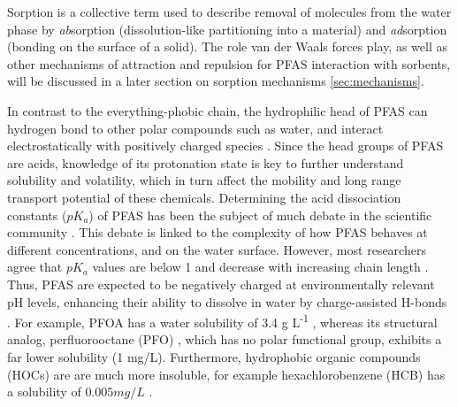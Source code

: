 Sorption is a collective term used to describe removal of molecules from the water phase by \textit{ab}sorption (dissolution-like partitioning into a material) and \textit{ad}sorption (bonding on the surface of a solid). The role van der Waals forces play, as well as other mechanisms of attraction and repulsion for PFAS interaction with sorbents, will be discussed in a later section on sorption mechanisms \cref{sec:mechanisms}. 

In contrast to the everything-phobic chain, the hydrophilic head of PFAS can hydrogen bond to other polar compounds such as water, and interact electrostatically with positively charged species \citep{sigmund2022sorption}. Since the head groups of PFAS are acids, knowledge of its protonation state is key to further understand solubility and volatility, which in turn affect the mobility and long range transport potential of these chemicals. Determining the acid dissociation constants (\(pK_a\)) of PFAS has been the subject of much debate in the scientific community \citep{Goss2009comment}. This debate is linked to the complexity of how PFAS behaves at different concentrations, and on the water surface. However, most researchers agree that \(pK_a\) values are below 1 and decrease with increasing chain length \citep{wang2011physchem,Reemtsma2016}. Thus, PFAS are expected to be negatively charged at environmentally relevant pH levels, enhancing their ability to dissolve in water by charge-assisted H-bonds \citep{Reemtsma2016}. For example, PFOA has a water solubility of 3.4 g L\textsuperscript{-1} \citep{PFOA}, whereas its structural analog, perfluorooctane (PFO) \citep{PFO}, which has no polar functional group, exhibits a far lower solubility (1 mg/L). Furthermore, hydrophobic organic compounds (HOCs) are are much more insoluble, for example hexachlorobenzene (HCB) has a solubility of $0.005 mg/L$ \citep{mcphedran2013hydrophobic}. 

